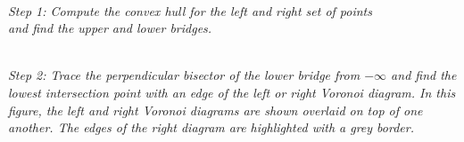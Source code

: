 \documentclass[12pt]{article}
\begin{document}
    \begin{center}
     \\
    {\em
    Step 1: Compute the convex hull for the left and right set of points\\
    and find the upper and lower bridges.}
    \vfill

     \\
    {\em Step 2: Trace the perpendicular bisector of the lower bridge from
    $ - \infty$ and find the lowest intersection point with an edge of the
    left or right Voronoi diagram.  In this figure, the left and right
    Voronoi diagrams are shown overlaid on top of one another.  The edges
    of the right diagram are highlighted with a grey border.  }


\end{center}
\end{document}
